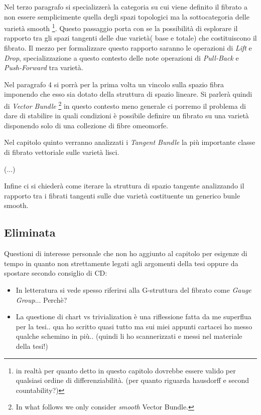 \documentclass[a4paper,12pt]{scrartcl}    %
\begin{document}
\begin{proposition}
Nel terzo paragrafo si specializzerà la categoria su cui viene definito il fibrato a non essere semplicimente quella degli spazi topologici ma la sottocategoria delle varietà smooth \footnote{in realtà per quanto detto in questo capitolo dovrebbe essere valido per qualsiasi ordine di differenziabilità. (per quanto riguarda hausdorff e second countability?)}.
Questo passaggio porta con se la possibilità di esplorare il rapporto tra gli spazi tangenti delle due varietà( base e totale) che costituiscono il fibrato. Il mezzo per formalizzare questo rapporto saranno le operazioni di \emph{Lift} e \emph{Drop}, specializzazione a questo contesto delle note operazioni di \emph{Pull-Back} e \emph{Push-Forward} tra varietà.

Nel paragrafo 4 si porrà per la prima volta un vincolo sulla spazio fibra imponendo che esso sia dotato 
della struttura di spazio lineare.
Si parlerà quindi di \emph{Vector Bundle} 
\footnote{In what follows we only consider \emph{smooth} Vector Bundle.} 
in questo contesto meno generale ci porremo il problema di dare di stabilire in quali condizioni è possibile definire un fibrato su una varietà disponendo solo di una collezione di fibre omeomorfe.

Nel capitolo quinto verranno analizzati i \emph{Tangent Bundle} la più importante classe di fibrato vettoriale sulle varietà lisci.

(...)

Infine ci si chiederà come iterare la struttura di spazio tangente analizzando il rapporto tra i fibrati tangenti sulle due varietà costituente un generico bunle smooth.


\subsection{Eliminata}
Questioni di interesse personale che non ho aggiunto al capitolo per esigenze di tempo  in quanto non strettamente legati agli argomenti della tesi oppure da spostare secondo consiglio di CD:
\begin{itemize}


\item In letteratura si vede spesso riferirsi alla G-struttura del fibrato come \emph{Gauge Group}... Perchè?

\item La questione di chart vs trivialization è una riflessione fatta da me superflua per la tesi.. qua ho scritto quasi tutto ma sui miei appunti cartacei ho messo qualche schemino in più.. (quindi li ho scannerizzati e messi nel materiale della tesi!)


\end{itemize}
\end{proposition}
\end{document}

